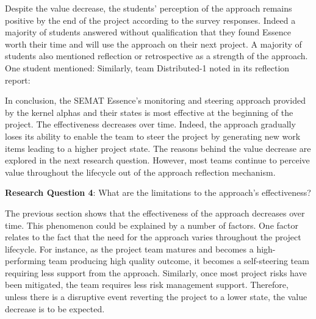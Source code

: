 Despite the value decrease, the students' perception of the approach remains positive by the end of the project according to the survey responses. Indeed a majority of students answered without qualification that they found Essence worth their time and will use the approach on their next project. A majority of students also mentioned reflection or retrospective as a strength of the approach. One student mentioned:  Similarly, team Distributed-1 noted in its reflection report: 

In conclusion, the SEMAT Essence's monitoring and steering approach provided by the kernel alphas and their states is most effective at the beginning of the project. The effectiveness decreases over time. Indeed, the approach gradually loses its ability to enable the team to steer the project by generating new work items leading to a higher project state. The reasons behind the value decrease are explored in the next research question. However, most teams continue to perceive value throughout the lifecycle out of the approach reflection mechanism.

\textbf{Research Question 4}: What are the limitations to the approach's effectiveness?

The previous section shows that the effectiveness of the approach decreases over time. This phenomenon could be explained by a number of factors. One factor relates to the fact that the need for the approach varies throughout the project lifecycle. For instance, as the project team matures and becomes a high-performing team producing high quality outcome, it becomes a self-steering team requiring less support from the approach. Similarly, once most project risks have been mitigated, the team requires less risk management support. Therefore, unless there is a disruptive event reverting the project to a lower state, the value decrease is to be expected.


